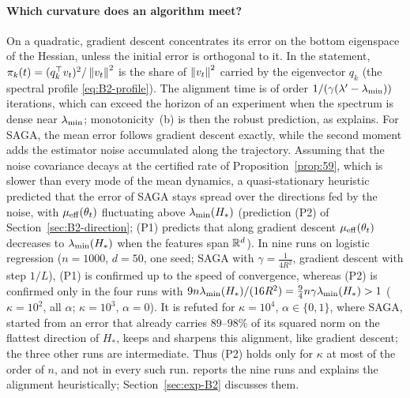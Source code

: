\paragraph{Which curvature does an algorithm meet?}
On a quadratic, gradient descent concentrates its error on the bottom eigenspace of the Hessian, unless the initial
error is orthogonal to it. In the statement, $\pi_k(t)=(q_k^\top v_t)^2/\left\|v_t\right\|^2$ is the share of $\left\|v_t\right\|^2$
carried by the eigenvector $q_k$ (the spectral profile \eqref{eq:B2-profile}).
The alignment time is of order $1/(\gamma(\lambda'-\lambda_{\min}))$ iterations, which can exceed the horizon of an experiment
when the spectrum is dense near $\lambda_{\min}$; monotonicity~(b) is then the robust prediction, as  explains. For
SAGA, the mean error follows gradient descent exactly, while the second moment adds the estimator noise accumulated along
the trajectory.
Assuming that the noise covariance decays at the certified rate of Proposition~\ref{prop:59}, which is slower than every
mode of the mean dynamics, a quasi-stationary heuristic predicted that the error of SAGA stays spread over the directions
fed by the noise, with $\mu_{\mathrm{eff}}(\theta_t)$ fluctuating above $\lambda_{\min}(H_\ast)$ (prediction (P2) of
Section~\ref{sec:B2-direction}; (P1) predicts that along gradient descent $\mu_{\mathrm{eff}}(\theta_t)$ decreases to $\lambda_{\min}(H_\ast)$
when the features span $\mathbb{R}^d$). In nine runs on logistic regression ($n=1000$, $d=50$, one seed; SAGA with
$\gamma=\frac1{4R^2}$, gradient descent with step $1/L$), (P1) is confirmed up to the speed of convergence, whereas (P2) is
confirmed only in the four runs with $9n\lambda_{\min}(H_\ast)/(16R^2)=\frac94n\gamma\lambda_{\min}(H_\ast)>1$ ($\kappa=10^2$, all $\alpha$;
$\kappa=10^3$, $\alpha=0$). It is refuted for $\kappa=10^4$, $\alpha\in\{0,1\}$, where SAGA, started from an error that
already carries $89$--$98\%$ of its squared norm on the flattest direction of $H_\ast$, keeps and sharpens this alignment,
like gradient descent; the three other runs are intermediate. Thus (P2) holds only for $\kappa$ at most of the order of $n$,
and not in every such run.  reports the nine runs and explains the alignment heuristically;
Section~\ref{sec:exp-B2} discusses them.


